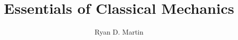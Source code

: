 \documentclass[10pt]{report}
\begin{document}
\title{Essentials of Classical Mechanics}
\author{Ryan D. Martin}
\maketitle

\tableofcontents
















%
\end{document}
